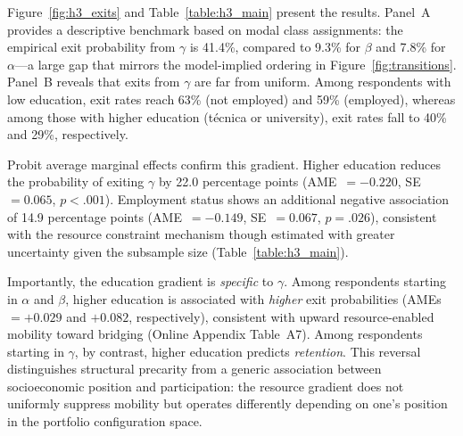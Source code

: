 Figure~\ref{fig:h3_exits} and Table~\ref{table:h3_main} present the results. Panel~A provides a descriptive benchmark based on modal class assignments: the empirical exit probability from $\gamma$ is 41.4\%, compared to 9.3\% for $\beta$ and 7.8\% for $\alpha$---a large gap that mirrors the model-implied ordering in Figure~\ref{fig:transitions}. Panel~B reveals that exits from $\gamma$ are far from uniform. Among respondents with low education, exit rates reach 63\% (not employed) and 59\% (employed), whereas among those with higher education (t\'ecnica or university), exit rates fall to 40\% and 29\%, respectively.

Probit average marginal effects confirm this gradient. Higher education reduces the probability of exiting $\gamma$ by 22.0 percentage points (AME~$= -0.220$, SE~$= 0.065$, $p < .001$). Employment status shows an additional negative association of 14.9 percentage points (AME~$= -0.149$, SE~$= 0.067$, $p = .026$), consistent with the resource constraint mechanism though estimated with greater uncertainty given the subsample size (Table~\ref{table:h3_main}).

Importantly, the education gradient is \emph{specific} to $\gamma$. Among respondents starting in $\alpha$ and $\beta$, higher education is associated with \emph{higher} exit probabilities (AMEs~$= +0.029$ and $+0.082$, respectively), consistent with upward resource-enabled mobility toward bridging (Online Appendix Table~A7). Among respondents starting in $\gamma$, by contrast, higher education predicts \emph{retention}. This reversal distinguishes structural precarity from a generic association between socioeconomic position and participation: the resource gradient does not uniformly suppress mobility but operates differently depending on one's position in the portfolio configuration space.

